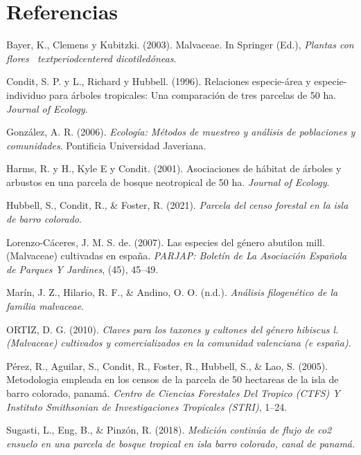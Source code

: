 \documentclass[11pt,]{article}
\begin{document}
\section*{Referencias}\label{referencias}

\hypertarget{refs}{}
\hypertarget{ref-bayer2003malvaceae}{}
Bayer, K., Clemens y Kubitzki. (2003). Malvaceae. In Springer (Ed.),
\emph{Plantas con flores ~textperiodcentered dicotiledóneas}.

\hypertarget{ref-condit1996species}{}
Condit, S. P. y L., Richard y Hubbell. (1996). Relaciones especie-área y
especie-individuo para árboles tropicales: Una comparación de tres
parcelas de 50 ha. \emph{Journal of Ecology}.

\hypertarget{ref-gonzalez2006ecologia}{}
González, A. R. (2006). \emph{Ecología: Métodos de muestreo y análisis
de poblaciones y comunidades}. Pontificia Universidad Javeriana.

\hypertarget{ref-harms2001habitat}{}
Harms, R. y H., Kyle E y Condit. (2001). Asociaciones de hábitat de
árboles y arbustos en una parcela de bosque neotropical de 50 ha.
\emph{Journal of Ecology}.

\hypertarget{ref-webBCI}{}
Hubbell, S., Condit, R., \& Foster, R. (2021). \emph{Parcela del censo
forestal en la isla de barro colorado}.

\hypertarget{ref-de2007especies}{}
Lorenzo-Cáceres, J. M. S. de. (2007). Las especies del género abutilon
mill.(Malvaceae) cultivadas en españa. \emph{PARJAP: Boletín de La
Asociación Española de Parques Y Jardines}, (45), 45--49.

\hypertarget{ref-marinanalisis}{}
Marín, J. Z., Hilario, R. F., \& Andino, O. O. (n.d.). \emph{Análisis
filogenético de la familia malvaceae}.

\hypertarget{ref-ortizclaves}{}
ORTIZ, D. G. (2010). \emph{Claves para los taxones y cultones del género
hibiscus l.(Malvaceae) cultivados y comercializados en la comunidad
valenciana (e españa)}.

\hypertarget{ref-perez2005metodologia}{}
Pérez, R., Aguilar, S., Condit, R., Foster, R., Hubbell, S., \& Lao, S.
(2005). Metodologia empleada en los censos de la parcela de 50 hectareas
de la isla de barro colorado, panamá. \emph{Centro de Ciencias
Forestales Del Tropico (CTFS) Y Instituto Smithsonian de Investigaciones
Tropicales (STRI)}, 1--24.

\hypertarget{ref-sugastimedicion}{}
Sugasti, L., Eng, B., \& Pinzón, R. (2018). \emph{Medición continúa de
flujo de co2 ensuelo en una parcela de bosque tropical en isla barro
colorado, canal de panamá.}




\newpage
\singlespacing 
\end{document}
